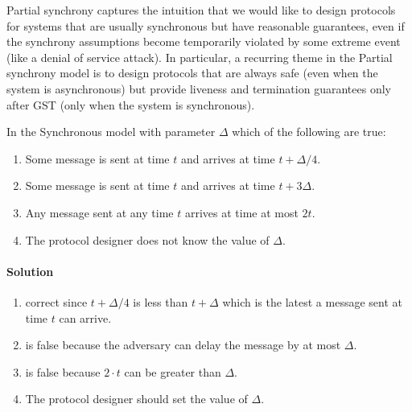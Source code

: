 Partial synchrony captures the intuition that we would like to design protocols for 
systems that are usually synchronous but have reasonable guarantees, 
even if the synchrony assumptions become temporarily violated by some extreme event
(like a denial of service attack). In particular, a recurring theme in the Partial
synchrony model is to design protocols that are always safe (even when the system
is asynchronous) but provide liveness and termination guarantees only
after GST (only when the system is synchronous).


\begin{xca}[quiz 1.A]
    In the Synchronous model with parameter $\Delta$ which of the following are true:
    \begin{enumerate}
        \item Some message is sent at time $t$ and arrives at time $t+\Delta/4$.
        \item Some message is sent at time $t$ and arrives at time $t+3\Delta$.
        \item Any message sent at any time $t$ arrives at time at most $2t$.
        \item The protocol designer does not know the value of $\Delta$.
    \end{enumerate}


\paragraph{Solution}
        \begin{enumerate}
            \item correct since $t+ \Delta/4$ is less than $t+ \Delta$ which is
            the latest a message sent at time $t$ can arrive.
            \item is false because the adversary can delay the message by at most $\Delta$.
            \item is false because $2\cdot t$ can be greater than $\Delta$.
            \item The protocol designer should set the value of $\Delta$.
        \end{enumerate}

\end{xca}

